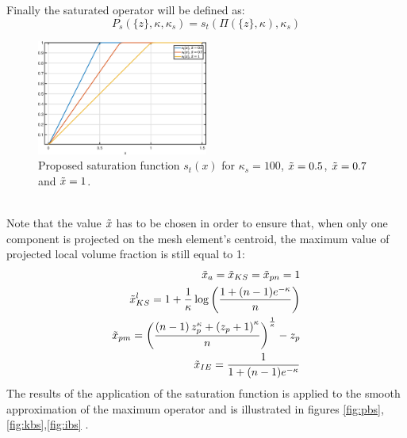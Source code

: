 Finally the saturated operator will be defined as:
\begin{equation}
    P_s(\lbrace z \rbrace,\kappa,\kappa_s)=s_t(\Pi(\lbrace z \rbrace,\kappa),\kappa_s)
\end{equation}
 \begin{figure}[!h]
 \centering
  \includegraphics[width=0.5\textwidth]{images/Ch3/saturation.eps}
\caption{Proposed saturation function $s_t(x)$ for $\kappa_s=100$, $\Tilde{x}=0.5$, $\Tilde{x}=0.7$ and  $\Tilde{x}=1$.}
\label{fig:st}       %
\end{figure}
\\
 Note that the value $\Tilde{x}$ has to be chosen in order to ensure that, when only one component is projected on the mesh element's centroid, the maximum value of projected local volume fraction  is still equal to 1:
 \begin{eqnarray}
    \label{eq:tilde}
    \Tilde{x}_a=\Tilde{x}_{KS}=\Tilde{x}_{pn}=1\\
    \Tilde{x}_{KS}^l= 1+\frac{1}{\kappa}\log{\left(\frac{1+(n-1)e^{-\kappa}}{n}\right)}\\
    \Tilde{x}_{pm}= \left(\frac{\left(n-1\right)z_p^\kappa+\left(z_p+1\right)^{\kappa}}{n}\right)^{\frac{1}{\kappa}}-z_p\\
    \Tilde{x}_{IE}=\frac{1}{1+(n-1)e^{-\kappa}}
    \label{eq:tilde_end}
 \end{eqnarray}
 The results of the application of the saturation function is applied to the smooth approximation of the maximum operator and is illustrated in figures \ref{fig:pbs},\ref{fig:kbs},\ref{fig:ibs} .
